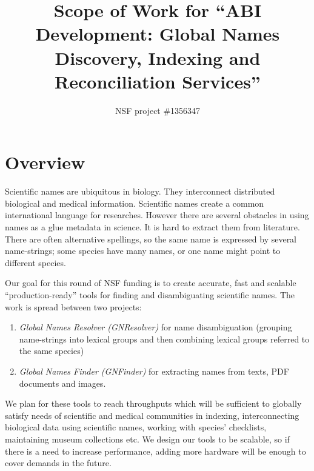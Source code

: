 \documentclass[11pt]{article}
\begin{document}
%
\author{NSF project \#1356347 }
\title{Scope of Work for ``ABI Development: Global Names Discovery, Indexing and Reconciliation Services''}
\maketitle

\section{Overview}

Scientific names are ubiquitous in biology. They interconnect distributed
biological and medical information. Scientific names create a common
international language for researches. However there are several obstacles in
using names as a glue metadata in science. It is hard to extract them from
literature. There are often alternative spellings, so the same name is
expressed by several name-strings; some species have many names, or one name
might point to different species.

Our goal for this round of NSF funding is to create accurate, fast and scalable
``production-ready'' tools for finding and disambiguating scientific names. The
work is spread between two projects:

\begin{enumerate}

  \item \textit{Global Names Resolver (GNResolver)} for name disambiguation
    (grouping name-strings into lexical groups and then combining lexical
    groups referred to the same species)

  \item \textit{Global Names Finder (GNFinder)} for extracting names from
    texts, PDF documents and images.

\end{enumerate}

We plan for these tools to reach throughputs which will be sufficient to
globally satisfy needs of scientific and medical communities in indexing,
interconnecting biological data using scientific names, working with species'
checklists, maintaining museum collections etc.  We design our tools to be
scalable, so if there is a need to increase performance, adding more hardware
will be enough to cover demands in the future.
\end{document}
